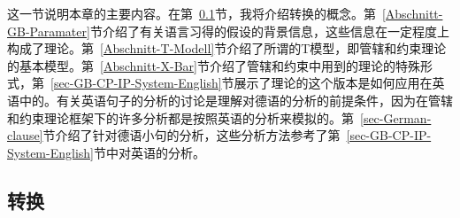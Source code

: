 这一节说明本章的主要内容。在第~\ref{Abschnitt-Transformationen}节，我将介绍转换的概念。第~\ref{Abschnitt-GB-Paramater}节介绍了有关语言习得的假设的背景信息，这些信息在一定程度上构成了理论。第~\ref{Abschnitt-T-Modell}节介绍了所谓的T模型，即管辖和约束理论的基本模型。第~\ref{Abschnitt-X-Bar}节介绍了管辖和约束中用到的\xbar 理论的特殊形式，第~\ref{sec-GB-CP-IP-System-English}节展示了\xbar 理论的这个版本是如何应用在英语中的。有关英语句子的分析的讨论是理解对德语的分析的前提条件，因为在管辖和约束理论框架下的许多分析都是按照英语的分析来模拟的。第~\ref{sec-German-clause}节介绍了针对德语小句的分析，这些分析方法参考了第~\ref{sec-GB-CP-IP-System-English}节中对英语的分析。

\subsection{转换}
\label{Abschnitt-Transformationen}


